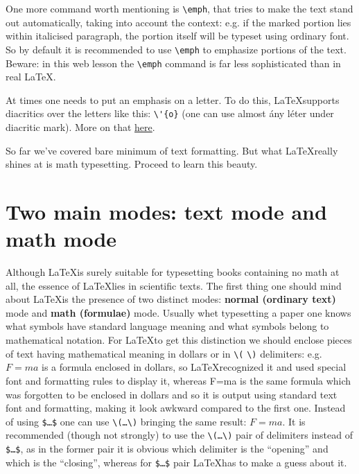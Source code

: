 {\par One more command worth mentioning is \verb"\emph", that tries to make the text stand out automatically, taking into account the context: e.g. if the marked portion lies within italicised paragraph, the portion itself will be typeset using ordinary font. So by default it is recommended to use \verb"\emph" to emphasize portions of the text. Beware: in this web lesson the \verb"\emph" command is far less sophisticated than in real \LaTeX.

\par At times one needs to put an emphasis on a letter. To do this, \LaTeX supports diacritics over the letters like this: \verb"\'{o}" (one can use almost \'{a}ny l\'{e}ter under diacritic mark). More on that \href{https://en.wikibooks.org/wiki/LaTeX/Special_Characters#Escaped_codes}{here}.

\par So far we’ve covered bare minimum of text formatting. But what \LaTeX really shines at is math typesetting. Proceed to learn this beauty.


\section{Two main modes: text mode and math mode}
\par Although \LaTeX is surely suitable for typesetting books containing no math at all, the essence of \LaTeX lies in scientific texts. The first thing one should mind about \LaTeX is the presence of two distinct modes: \textbf{normal (ordinary text)} mode and \textbf{math (formulae)} mode. Usually whet typesetting a paper one knows what symbols have standard language meaning and what symbols belong to mathematical notation. For \LaTeX to get this distinction we should enclose pieces of text having mathematical meaning in dollars or in \verb"\(" \verb"\)" delimiters: e.g. $F=ma$ is a formula enclosed in dollars, so \LaTeX recognized it and used special font and formatting rules to display it, whereas F=ma is the same formula which was forgotten to be enclosed in dollars and so it is output using standard text font and formatting, making it look awkward compared to the first one. Instead of using \verb"$…$" one can use \verb"\(…\)" bringing the same result: \(F=ma.\) It is recommended (though not strongly) to use the \verb"\(…\)" pair of delimiters instead of \verb"$…$", as in the former pair it is obvious which delimiter is the “opening” and which is the “closing”, whereas for \verb"$…$" pair \LaTeX has to make a guess about it.


}
